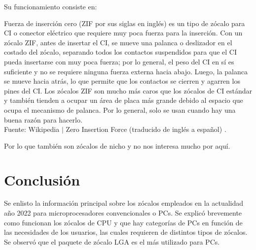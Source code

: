 \documentclass[conference]{IEEEtran}
\begin{document}
\bigbreak

Su funcionamiento consiste en:

\bigbreak

\begin{displayquote}
    Fuerza de inserción cero (ZIF por sus siglas en inglés) es un tipo de zócalo para CI o conector eléctrico que requiere muy poca fuerza para la inserción. Con un zócalo ZIF, antes de insertar el CI, se mueve una palanca o deslizador en el costado del zócalo, separando todos los contactos suspendidos para que el CI pueda insertarse con muy poca fuerza; por lo general, el peso del CI en sí es suficiente y no se requiere ninguna fuerza externa hacia abajo. Luego, la palanca se mueve hacia atrás, lo que permite que los contactos se cierren y agarren los pines del CI. Los zócalos ZIF son mucho más caros que los zócalos de CI estándar y también tienden a ocupar un área de placa más grande debido al espacio que ocupa el mecanismo de palanca. Por lo general, solo se usan cuando hay una buena razón para hacerlo.\\
    \small
    Fuente: Wikipedia $\mid$ Zero Insertion Force (traducido de inglés a español) \cite{wikipedia-zif-2021}.
\end{displayquote}

\bigbreak

Por lo que también son zócalos de nicho y no nos interesa mucho por aquí.

\section{Conclusión}

Se enlisto la información principal sobre los zócalos empleados en la actualidad año 2022 para microprocesadores convencionales o PCs. Se explicó brevemente como funcionan los zócalos de CPU y que hay categorías de PCs en función de las necesidades de los usuarios, las cuales requieren de distintos tipos de zócalos. Se observó que el paquete de zócalo LGA es el más utilizado para PCs.

\printbibliography
\end{document}
